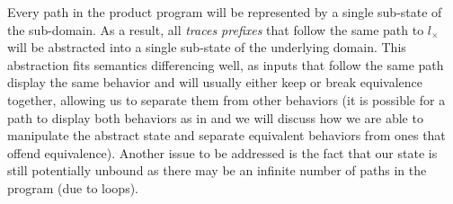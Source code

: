 
Every path in the product program will be represented by a single sub-state of the sub-domain. As a result, all \emph{traces prefixes} that follow the same path to $l_{\times}$ will be abstracted into a single sub-state of the underlying domain. This abstraction fits semantics differencing well, as inputs that follow the same path display the same behavior and will usually either keep or break equivalence together, allowing us to separate them from other behaviors (it is possible for a path to display both behaviors as in  and we will discuss how we are able to manipulate the abstract state and separate equivalent behaviors from ones that offend equivalence). Another issue to be addressed is the fact that our state is still potentially unbound as there may be an infinite number of paths in the program (due to loops).

